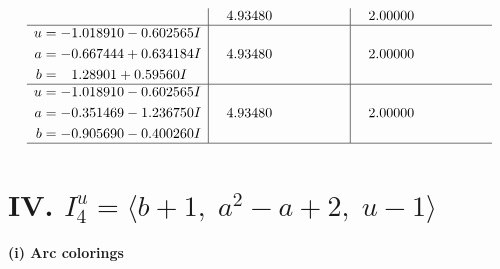 \documentclass[1p]{elsarticle_modified}
\theoremstyle{definition}
\begin{document}
$$\begin{array}{c|c|c}
 & \phantom{-}4.93480\phantom{ +0.000000I} & \phantom{-}2.00000\phantom{ +0.000000I} \\ \hline\begin{aligned}
u &= -1.018910 - 0.602565 I \\
a &= -0.667444 + 0.634184 I \\
b &= \phantom{-}1.28901 + 0.59560 I\end{aligned}
 & \phantom{-}4.93480\phantom{ +0.000000I} & \phantom{-}2.00000\phantom{ +0.000000I} \\ \hline\begin{aligned}
u &= -1.018910 - 0.602565 I \\
a &= -0.351469 - 1.236750 I \\
b &= -0.905690 - 0.400260 I\end{aligned}
 & \phantom{-}4.93480\phantom{ +0.000000I} & \phantom{-}2.00000\phantom{ +0.000000I}\\
 \hline 
 \end{array}$$\newpage\newpage\renewcommand{\arraystretch}{1}
\centering \section*{IV. $I^u_{4}= \langle b+1,\;a^2- a+2,\;u-1 \rangle$}
\flushleft \textbf{(i) Arc colorings}\\
\end{document}
